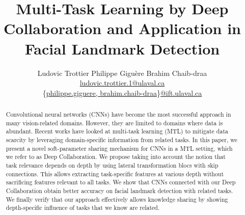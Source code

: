 \documentclass[runningheads]{llncs}
\begin{document}
\pagestyle{headings}
\mainmatter
\def\ECCV18SubNumber{1653}  %

\title{Multi-Task Learning by Deep Collaboration and Application in Facial Landmark Detection}


\author{
    Ludovic Trottier \qquad Philippe Gigu\`ere \qquad Brahim Chaib-draa \\
    {\footnotesize \url{ludovic.trottier.1@ulaval.ca}} \\
    {\footnotesize \{\url{philippe.giguere, brahim.chaib-draa}\}\url{@ift.ulaval.ca}}
}


\maketitle

\begin{abstract}
    Convolutional neural networks (CNNs) have become the most successful approach in many vision-related domains. However, they are limited to domains where data is abundant. 
    Recent works have looked at multi-task learning (MTL) to mitigate data scarcity by leveraging domain-specific information from related tasks.
    In this paper, we present a novel soft-parameter sharing mechanism for CNNs in a MTL setting, which we refer to as Deep Collaboration. We propose taking into account the notion that task relevance depends on depth by using lateral transformation blocs with skip connections. This allows extracting task-specific features at various depth without sacrificing features relevant to all tasks.
    We show that CNNs connected with our Deep Collaboration obtain better accuracy on facial landmark detection with related tasks. We finally verify that our approach effectively allows knowledge sharing by showing depth-specific influence of tasks that we know are related.
\end{abstract}
\end{document}
